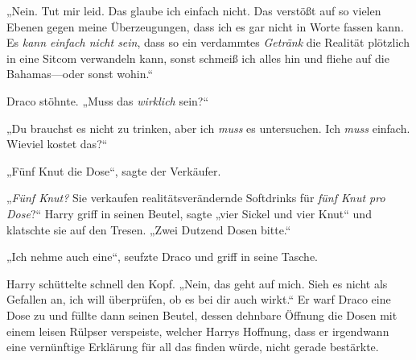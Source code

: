 „Nein. Tut mir leid. Das glaube ich einfach nicht. Das verstößt auf so vielen Ebenen gegen meine Überzeugungen, dass ich es gar nicht in Worte fassen kann. Es \emph{kann einfach nicht sein}, dass so ein verdammtes \emph{Getränk} die Realität plötzlich in eine Sitcom verwandeln kann, sonst schmeiß ich alles hin und fliehe auf die Bahamas—oder sonst wohin.“

Draco stöhnte. „Muss das \emph{wirklich} sein?“

„Du brauchst es nicht zu trinken, aber ich \emph{muss} es untersuchen. Ich \emph{muss} einfach. Wieviel kostet das?“

„Fünf Knut die Dose“, sagte der Verkäufer.

„\emph{Fünf Knut?} Sie verkaufen realitätsverändernde Softdrinks für \emph{fünf Knut pro Dose}?“ Harry griff in seinen Beutel, sagte „vier Sickel und vier Knut“ und klatschte sie auf den Tresen. „Zwei Dutzend Dosen bitte.“

„Ich nehme auch eine“, seufzte Draco und griff in seine Tasche.

Harry schüttelte schnell den Kopf. „Nein, das geht auf mich. Sieh es nicht als Gefallen an, ich will überprüfen, ob es bei dir auch wirkt.“ Er warf Draco eine Dose zu und füllte dann seinen Beutel, dessen dehnbare Öffnung die Dosen mit einem leisen Rülpser verspeiste, welcher Harrys Hoffnung, dass er irgendwann eine vernünftige Erklärung für all das finden würde, nicht gerade bestärkte.

